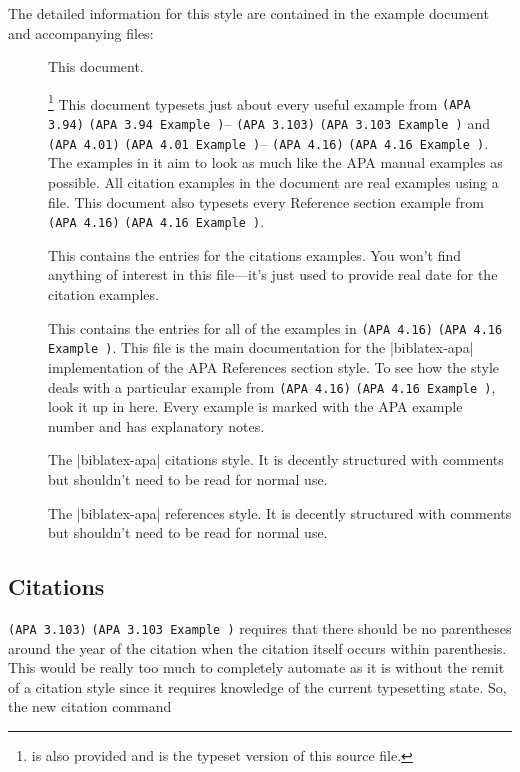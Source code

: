\documentclass{ltxdockit}
\newcommand\apa[2][]{\ifthenelse{\equal{#1}{}}%
                       {\texttt{(APA #2)}}%
                       {\texttt{(APA #2 Example #1)}}}
\begin{document}
The detailed information for this style are contained in the example document and
accompanying  files:
\begin{description}
\item[] This document.
\item[]\footnote{
    is also provided and is the typeset version of this \latex source
    file.} This document typesets just about every useful example from
  \apa{3.94}--\apa{3.103} and \apa{4.01}--\apa{4.16}. The examples in it
  aim to look as much like the APA manual examples as possible. All
  citation examples in the document are real examples using a 
  file. This document also typesets every Reference section example from
  \apa{4.16}.
\item[] This contains the 
  entries for the citations examples. You won't find anything of interest
  in this file---it's just used to provide real date for the citation
  examples.
\item[] This contains the
   entries for all of the examples in \apa{4.16}. This file is
  the main documentation for the |biblatex-apa| implementation of the APA
  References section style. To see how the style deals with a particular
  example from \apa{4.16}, look it up in here. Every example is marked with
  the APA example number and has explanatory notes.
\item[] The |biblatex-apa| citations style. It is
  decently structured with comments but shouldn't need to be read for
  normal use.
\item[] The |biblatex-apa| references style. It is
  decently structured with comments but shouldn't need to be read for
  normal use.
\end{description}

\subsection{Citations}

\apa{3.103} requires that there should be no parentheses around the year of
the citation when the citation itself occurs within parenthesis. This would
be really too much to completely automate as it is without the remit of a
citation style since it requires knowledge of the current typesetting
state. So, the new citation command
\end{document}
